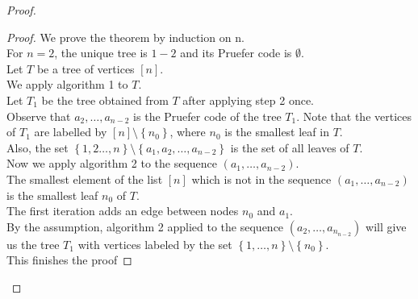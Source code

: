 \documentclass[../main.tex]{subfiles}
\begin{document}
\begin{proof}
\begin{thm}
	
\end{thm}
\begin{proof}
We prove the theorem by induction on n.\\
For $n=2$, the unique tree is $ 1 - 2$ and its Pruefer code is  $ \emptyset$.\\
Let $T$ be a tree of vertices $ [ n] $.\\
We apply algorithm 1 to $T$.\\
Let $T_1$ be the tree obtained from $T$ after applying step 2 once.\\
Observe that $ a_2, \ldots, a_{n-2} $ is the Pruefer code of the tree $T_1$. Note that the vertices of $T_1$ are labelled by $ [ n]  \setminus \left\{ n_0 \right\}  $, where $n_0$ is the smallest leaf in $T$.\\
Also, the set $ \left\{ 1,2 \ldots, n \right\} \setminus \left\{ a_1, a_{2} , \ldots, a_{n-2} \right\} $ is the set of all leaves of $T$.\\
Now we apply algorithm 2 to the sequence $ ( a_1, \ldots, a_{n-2} ) $.\\
The smallest element of the list $ [ n] $ which is not in the sequence $ ( a_1, \ldots, a_{n-2} ) $ is the smallest leaf $n_0$ of $T$.\\
The first iteration adds an edge between nodes $n_0$ and $a_1$.\\
By the assumption, algorithm 2 applied to the sequence $ ( a_2,\ldots, a_{n_{n-2} } ) $ will give us the tree $T_{1}$ with vertices labeled by the set $ \left\{ 1, \ldots, n \right\} \setminus \left\{ n_0 \right\} $.\\
This finishes the proof

\end{proof}



\end{proof}
\end{document}
